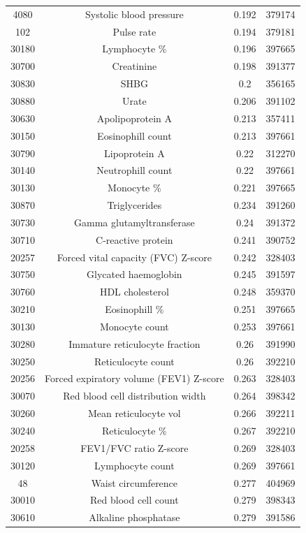 \begin{longtable}{|c|c|c|c|}
4080 & Systolic blood pressure & 0.192 & 379174 \\
102 & Pulse rate & 0.194 & 379181 \\
30180 &  Lymphocyte \% & 0.196 & 397665 \\
30700 &  Creatinine & 0.198 & 391377  \\
30830 &  SHBG & 0.2 & 356165 \\
30880 &  Urate & 0.206 & 391102 \\
30630 &  Apolipoprotein A & 0.213 & 357411 \\
30150 &  Eosinophill count & 0.213 & 397661 \\
30790 &  Lipoprotein A & 0.22 & 312270 \\
30140 &  Neutrophill count & 0.22 & 397661  \\
30130 &  Monocyte \% & 0.221 & 397665 \\
30870 &  Triglycerides & 0.234 & 391260 \\
30730 &  Gamma glutamyltransferase & 0.24 & 391372 \\
30710 &  C-reactive protein & 0.241 & 390752 \\
20257 & Forced vital capacity (FVC) Z-score & 0.242 & 328403 \\
30750 &  Glycated haemoglobin & 0.245 & 391597  \\
30760 &  HDL cholesterol & 0.248 & 359370 \\
30210 &  Eosinophill \% & 0.251 & 397665 \\
30130 &  Monocyte count & 0.253 & 397661 \\
30280 &  Immature reticulocyte fraction & 0.26 & 391990 \\
30250 &  Reticulocyte count & 0.26 & 392210 \\
20256 & Forced expiratory volume (FEV1) Z-score & 0.263 & 328403\\
30070 &  Red blood cell distribution width & 0.264 & 398342  \\
30260 &  Mean reticulocyte vol & 0.266 & 392211 \\
30240 &  Reticulocyte \% & 0.267 & 392210 \\
20258 & FEV1/FVC ratio Z-score & 0.269 & 328403\\
30120 &  Lymphocyte count & 0.269 & 397661 \\
48 & Waist circumference & 0.277 & 404969\\
30010 &  Red blood cell count & 0.279 & 398343 \\
30610 &  Alkaline phosphatase & 0.279 & 391586 \\

\end{longtable}
